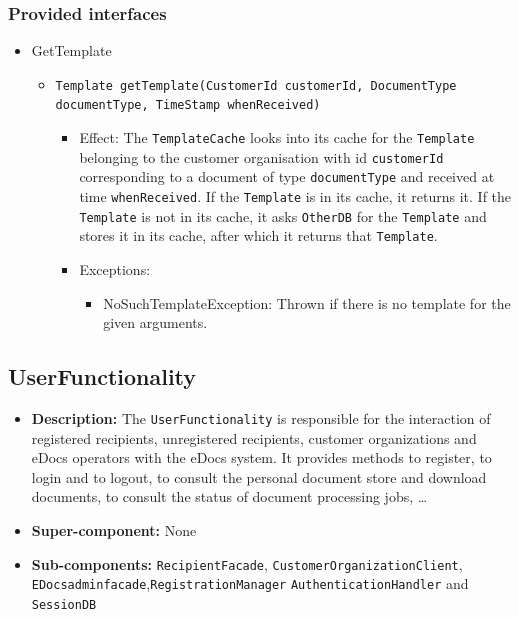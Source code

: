 \documentclass[a4paper,10pt]{article}
\begin{document}
\subsubsection*{Provided interfaces}
\begin{itemize}
	\item GetTemplate
    \begin{itemize}
    
   		\item \texttt{Template getTemplate(CustomerId customerId, DocumentType documentType, TimeStamp whenReceived)}
        \begin{itemize}
            \item Effect:  The \texttt{TemplateCache} looks into its cache for the \texttt{Template} belonging to the customer organisation with id \texttt{customerId} corresponding to a document of type \texttt{documentType} and received at time \texttt{whenReceived}. If the \texttt{Template} is in its cache, it returns it. If the \texttt{Template} is not in its cache, it asks \texttt{OtherDB} for the \texttt{Template} and stores it in its cache, after which it returns that \texttt{Template}.
            \item Exceptions:
            \begin{itemize}
                \item NoSuchTemplateException: Thrown if there is no template for the given arguments.
            \end{itemize}
        \end{itemize}
    \end{itemize}
\end{itemize}

\subsection{UserFunctionality}
\begin{itemize}
    \item \textbf{Description:} The \texttt{UserFunctionality} is responsible for the interaction of registered recipients, unregistered recipients, customer organizations and eDocs operators with the eDocs system. It provides methods to register, to login and to logout, to consult the personal document store and download documents, to consult the status of document processing jobs, \dots
    \item \textbf{Super-component:} None
    \item \textbf{Sub-components:} \texttt{RecipientFacade}, \texttt{CustomerOrganizationClient}, \texttt{EDocsadminfacade},\texttt{RegistrationManager} \texttt{AuthenticationHandler} and \texttt{SessionDB}
\end{itemize}
\end{document}

